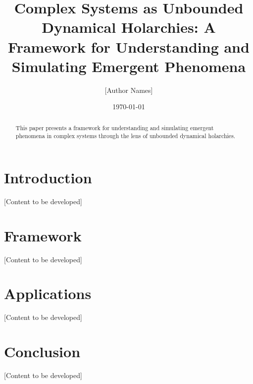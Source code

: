 \documentclass{article}
\title{Complex Systems as Unbounded Dynamical Holarchies: A Framework for Understanding and Simulating Emergent Phenomena}
\author{[Author Names]}
\date{\today}
\begin{document}
\maketitle

\begin{abstract}
This paper presents a framework for understanding and simulating emergent phenomena in complex systems through the lens of unbounded dynamical holarchies.
\end{abstract}

\section{Introduction}

[Content to be developed]

\section{Framework}

[Content to be developed]

\section{Applications}

[Content to be developed]

\section{Conclusion}

[Content to be developed]



\end{document}
